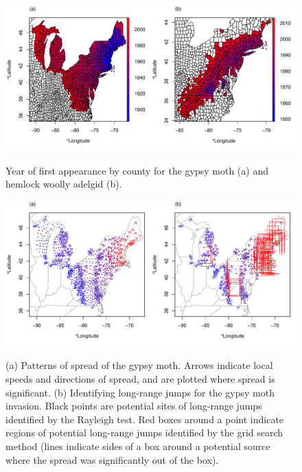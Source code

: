 \documentclass[12pt]{article}
\begin{document}
\clearpage

\begin{figure}
\centering
\caption{Year of first appearance by county for the gypsy moth (a) and hemlock woolly adelgid (b).}
\includegraphics[width=\textwidth]{figures/firstappearance}
\label{fig:first}
\end{figure}


\begin{figure}
\centering
\caption{(a) Patterns of spread of the gypsy moth. Arrows indicate local speeds and directions of spread, and are plotted where spread is significant. (b) Identifying long-range jumps for the gypsy moth invasion. Black points are potential sites of long-range jumps identified by the Rayleigh test. Red boxes around a point indicate regions of potential long-range jumps identified by the grid search method (lines indicate sides of a box around a potential source where the spread was significantly out of the box).}
\includegraphics[width=\textwidth]{figures/MothSpread}
\label{fig:mothspread}
\end{figure}
\end{document}
